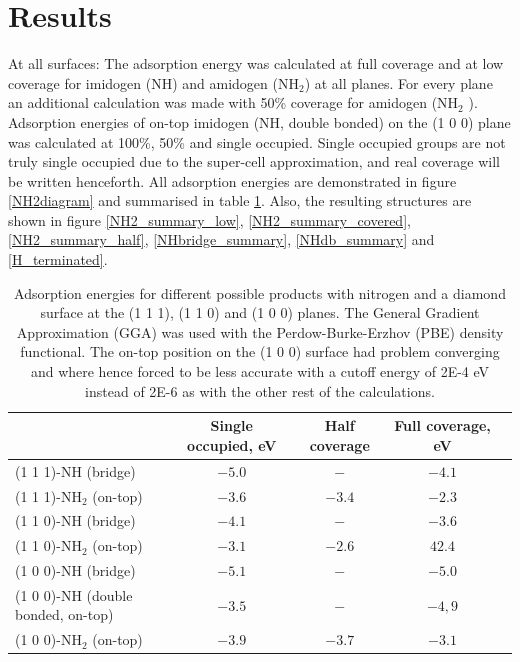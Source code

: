 \documentclass[12pt,a4paper]{article}
\begin{document}
\section{Results}
At all surfaces: The adsorption energy was calculated at full coverage and at low coverage for imidogen (NH) and amidogen (NH$_2$) at all planes. For every plane an additional calculation was made with 50\% coverage for amidogen (NH$_2$ ). Adsorption energies of on-top imidogen (NH, double bonded) on the (1 0 0) plane was calculated at 100\%, 50\% and single occupied. Single occupied groups are not truly single occupied due to the super-cell approximation, and real coverage will be written henceforth. All adsorption energies are demonstrated in figure \ref{NH2diagram} and summarised in table \ref{adsorptionEnergies}. Also, the resulting structures are shown in figure   \ref{NH2_summary_low}, \ref{NH2_summary_covered}, \ref{NH2_summary_half}, \ref{NHbridge_summary}, \ref{NHdb_summary} and \ref{H_terminated}. 

\begin{table}[!h] \caption{Adsorption energies for different possible products with nitrogen and a diamond surface at the (1 1 1), (1 1 0) and (1 0 0) planes. The General Gradient Approximation (GGA) was used with the Perdow-Burke-Erzhov (PBE) density functional. The on-top position on the (1 0 0) surface had problem converging and where hence forced to be less accurate with a cutoff energy of 2E-4 eV instead of 2E-6 as with the other rest of the calculations.} \label{adsorptionEnergies}
\begin{adjustbox}{max width=\textwidth}
\begin{tabular}{|l|c|c|c|c|}
								& Single occupied, eV	&  Half coverage 	& Full coverage, eV \\ \hline
(1 1 1)-NH (bridge)						&$-5.0$ 			& $- $			& $-4.1 $ \\ \hline
(1 1 1)-NH$_2$ (on-top)					&$-3.6$ 			& $-3.4 $  		& $-2.3 $ \\ \hline
(1 1 0)-NH (bridge)						&$-4.1$ 			& $- $  		& $-3.6 $ \\ \hline
(1 1 0)-NH$_2$ (on-top)					&$-3.1$ 			& $-2.6 $ 		& $42.4 $ \\ \hline
(1 0 0)-NH (bridge)						&$-5.1$ 			& $- $ 		& $-5.0 $ \\ \hline
(1 0 0)-NH (double bonded, on-top) 			&$-3.5$ 			& $- $ 		& $-4,9 $ \\ \hline
(1 0 0)-NH$_2$ (on-top)					&$-3.9$ 			& $-3.7 $ 		& $-3.1 $ \\ \hline
\end{tabular}
\end{adjustbox}
\end{table}
\end{document}
